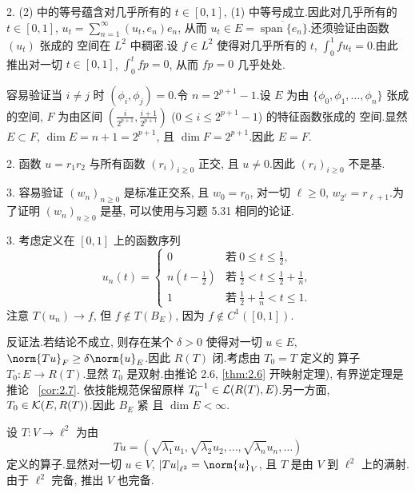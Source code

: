 2. (2) 中的等号蕴含对几乎所有的 $t\in[0,1]$, (1) 中等号成立.因此对几乎所有的
$t\in[0,1]$, $u_t=\sum_{n=1}^\infty(u_t,e_n)e_n$, 从而
$u_t\in E=\overline{\operatorname{span}\{e_n\}}$.还须验证由函数 $(u_t)$ 张成的
空间在 $L^2$ 中稠密.设 $f\in L^2$ 使得对几乎所有的 $t$, $\int_0^1fu_t=0$.由此
推出对一切 $t\in[0,1]$, $\int_0^tfp=0$, 从而 $fp=0$ 几乎处处.


容易验证当 $i\ne j$ 时 $(\phi_i,\phi_j)=0$.令 $n=2^{p+1}-1$.设 $E$ 为由
$\{\phi_0,\phi_1,\dots,\phi_n\}$ 张成的空间, $F$ 为由区间
$(\frac{i}{2^{p+1}},\frac{i+1}{2^{p+1}})$ ($0\le i\le2^{p+1}-1$) 的特征函数张成的
空间.显然 $E\subset F$, $\dim E=n+1=2^{p+1}$, 且 $\dim F=2^{p+1}$.因此 $E=F$.


2. 函数 $u=r_1r_2$ 与所有函数 $(r_i)_{i\ge0}$ 正交, 且 $u\ne0$.因此
$(r_i)_{i\ge0}$ 不是基.

3. 容易验证 $(w_n)_{n\ge0}$ 是标准正交系, 且 $w_0=r_0$, 对一切 $\ell\ge0$,
$w_{2^\ell}=r_{\ell+1}$.为了证明 $(w_n)_{n\ge0}$ 是基, 可以使用与习题 5.31
相同的论证.

3. 考虑定义在 $[0,1]$ 上的函数序列
\begin{equation*}
u_n(t)=\begin{cases}
0 & \text{若}\ 0\le t\le\frac12,\\
n\left(t-\frac12\right) & \text{若}\ \frac12<t\le\frac12+\frac1n,\\
1 & \text{若}\ \frac12+\frac1n<t\le1.
\end{cases}
\end{equation*}
注意 $T(u_n)\to f$, 但 $f\notin T(B_E)$, 因为 $f\notin C^1([0,1])$.


反证法.若结论不成立, 则存在某个 $\delta>0$ 使得对一切 $u\in E$,
$\norm{Tu}_F\ge\delta\norm{u}_E$.因此 $R(T)$ 闭.考虑由 $T_0=T$ 定义的
算子 $T_0:E\to R(T)$.显然 $T_0$ 是双射.由推论 2.6,
\ref{thm:2.6} 开映射定理), 有界逆定理是推论~
\ref{cor:2.7}. 依技能规范保留原样
$T_0^{-1}\in\mathcal{L}(R(T),E)$.另一方面, $T_0\in\mathcal{K}(E,R(T))$.因此 $B_E$ 紧
且 $\dim E<\infty$.


设 $T:V\to\ell^2$ 为由
\begin{equation*}
Tu=(\sqrt{\lambda_1}u_1,\sqrt{\lambda_2}u_2,\dots,\sqrt{\lambda_n}u_n,\dots)
\end{equation*}
定义的算子.显然对一切 $u\in V$, $\abs{Tu}_{\ell^2}=\norm{u}_V$, 且 $T$ 是由
$V$ 到 $\ell^2$ 上的满射.由于 $\ell^2$ 完备, 推出 $V$ 也完备.

